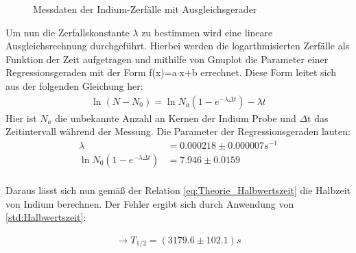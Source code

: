 

\begin{figure}[htbp]
\caption{Messdaten der Indium-Zerfälle mit Ausgleichsgerader}
\label{fig:Abbildung}
\end{figure}
Um nun die Zerfallskonstante $\lambda$ zu bestimmen wird eine lineare Ausgleichsrechnung durchgeführt. Hierbei werden die logarthmisierten Zerfälle als Funktion der Zeit aufgetragen und mithilfe von Gnuplot die Parameter einer Regressionsgeraden mit der Form f(x)=a$\cdot$x+b errechnet. Diese Form leitet sich aus der folgenden Gleichung her:
\begin{align*}
\ln(N-N_0)=\ln N_a(1-e^{-\lambda\Delta t})-\lambda t
\end{align*}
Hier ist $N_a$ die unbekannte Anzahl an Kernen der Indium Probe und $\Delta$t das Zeitintervall während der Messung. 
Die Parameter der Regressionsgeraden lauten:
\begin{align*}
\lambda&=0.000218\pm 0.000007s^{-1}\\
\ln N_0(1-e^{-\lambda\Delta t})&=7.946\pm0.0159\\
\end{align*}

Daraus lässt sich nun gemäß der Relation \cref{eq:Theorie_Halbwertszeit} die Halbzeit von Indium berechnen. Der Fehler 
ergibt sich durch Anwendung von \cref{std:Halbwertszeit}:

\begin{align*}
\rightarrow T_{1/2}=(3179.6\pm 102.1)s
\end{align*}